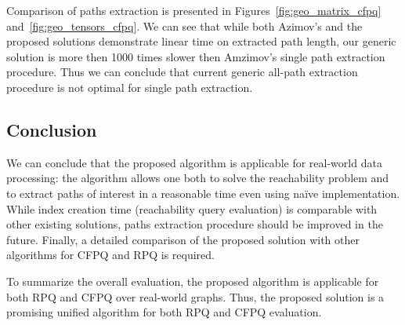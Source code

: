 Comparison of paths extraction is presented in Figures~\ref{fig:geo_matrix_cfpq} and~\ref{fig:geo_tensors_cfpq}.
We can see that while both Azimov's and the proposed solutions demonstrate linear time on extracted path length, our generic solution is more then 1000 times slower then Amzimov's single path extraction procedure. 
Thus we can conclude that current generic all-path extraction procedure is not optimal for single path extraction. 

\subsection{Conclusion}

We can conclude that the proposed algorithm is applicable for real-world data processing: the algorithm allows one both to solve the reachability problem and to extract paths of interest in a reasonable time even using na{\"i}ve implementation. 
While index creation time (reachability query evaluation) is comparable with other existing solutions, paths extraction procedure should be improved in the future. 
Finally, a detailed comparison of the proposed solution with other algorithms for CFPQ and RPQ is required.

To summarize the overall evaluation, the proposed algorithm is applicable for both RPQ and CFPQ over real-world graphs. 
Thus, the proposed solution is a promising unified algorithm for both RPQ and CFPQ evaluation.
